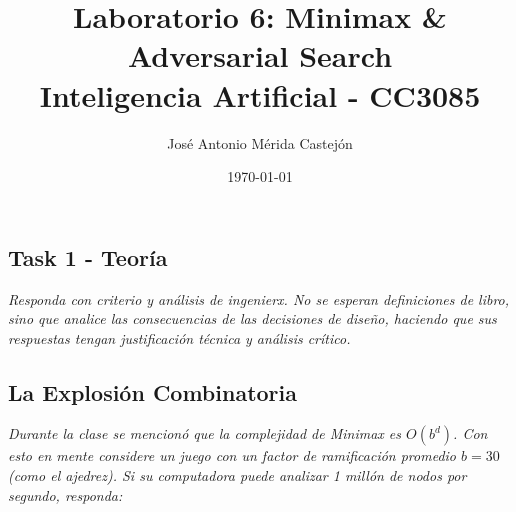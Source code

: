 \documentclass[11pt]{article}
\title{\textbf{Laboratorio 6: Minimax \& Adversarial Search} \vspace{1em}\\
  Inteligencia Artificial - CC3085}
\author{José Antonio Mérida Castejón}
\date{\today}
\begin{document}
\maketitle

\subsection*{Task 1 - Teoría}

\textit{Responda con criterio y análisis de ingenierx. No se esperan definiciones de libro, sino que analice las
	consecuencias de las decisiones de diseño, haciendo que sus respuestas tengan justificación técnica y análisis crítico.}

\subsection*{La Explosión Combinatoria}

\textit{Durante la clase se mencionó que la complejidad de Minimax es $O(b^d)$. Con esto en mente considere un
	juego con un factor de ramificación promedio $b=30$ (como el ajedrez). Si su computadora puede analizar 1 millón
	de nodos por segundo, responda:}
\end{document}
